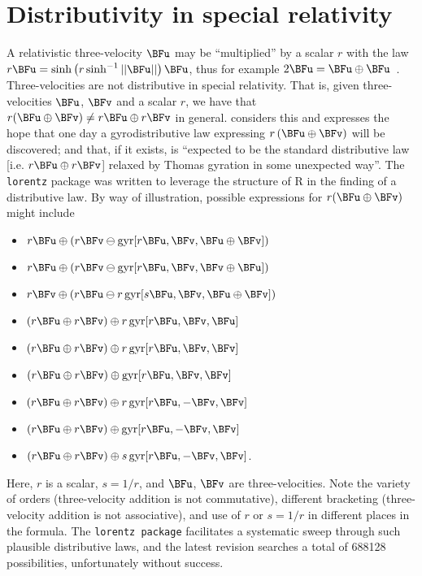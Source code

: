 \documentclass[ijoc,nonblindrev]{informs3} %
\begin{document}
\section{Distributivity in special relativity}

A relativistic three-velocity $\BFu$ may be ``multiplied'' by a scalar
$r$ with the law
$r\BFu=\sinh\left(r\sinh^{-1}\left|\left|\BFu\right|\right|\right)\BFu$,
thus for example $2\BFu=\BFu\oplus\BFu$~\citep{ungar1997}.
Three-velocities are not distributive in special relativity.  That is,
given three-velocities $\BFu$, $\BFv$ and a scalar $r$, we have that
$r(\BFu\oplus\BFv)\neq r\BFu\oplus r\BFv$ in general.
\cite{ungar1997} considers this and expresses the hope that one day a
gyrodistributive law expressing $r\left(\BFu\oplus\BFv\right)$ will be
discovered; and that, if it exists, is ``expected to be the standard
distributive law [i.e. $r\BFu\oplus r\BFv$] relaxed by Thomas gyration
in some unexpected way''.  The {\tt lorentz} package was written to
leverage the structure of R in the finding of a distributive law.  By
way of illustration, possible expressions for $r(\BFu\oplus\BFv)$ might
include

\begin{itemize}
\item $r\BFu  \oplus (r\BFv  \ominus \operatorname{gyr}[r\BFu, \BFv,\BFu\oplus\BFv])$
\item $r\BFu  \oplus (r\BFv  \ominus \operatorname{gyr}[r\BFu, \BFv,\BFv\oplus\BFu])$
\item $r\BFv  \oplus (r\BFu  \ominus r\operatorname{gyr}[s\BFu, \BFv,\BFu\oplus\BFv])$
\item $(r\BFu \oplus r\BFv)  \oplus r\operatorname{gyr}[r\BFu, \BFv,\BFu]$
\item $(r\BFu \oplus r\BFv)  \oplus r\operatorname{gyr}[r\BFu, \BFv,\BFv]$
\item $(r\BFu \oplus r\BFv)  \oplus \operatorname{gyr}[r\BFu, \BFv,\BFv]$
\item $(r\BFu \oplus r\BFv)  \oplus r\operatorname{gyr}[r\BFu,-\BFv,\BFv]$
\item $(r\BFu \oplus r\BFv)  \oplus   \operatorname{gyr}[r\BFu,-\BFv,\BFv]$
\item $(r\BFu \oplus r\BFv)  \oplus s\operatorname{gyr}[r\BFu,-\BFv,\BFv]$.
\end{itemize}

Here, $r$ is a scalar, $s=1/r$, and $\BFu$, $\BFv$ are three-velocities.
Note the variety of orders (three-velocity addition is not
commutative), different bracketing (three-velocity addition is not
associative), and use of $r$ or $s=1/r$ in different places in the
formula.  The {\tt lorentz package} facilitates a systematic sweep
through such plausible distributive laws, and the latest revision
searches a total of 688128 possibilities, unfortunately without
success.
\end{document}
